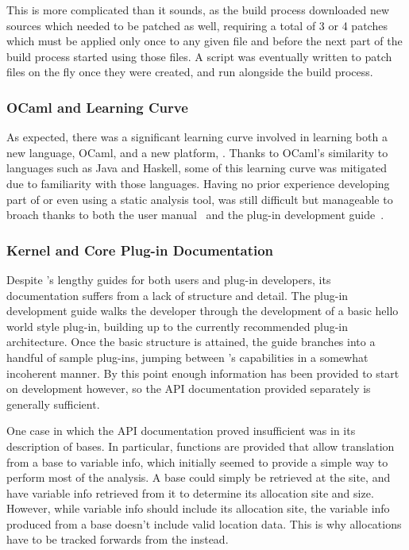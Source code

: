 This is more complicated than it sounds, as the build process downloaded new sources which needed to be patched as well, requiring a total of 3 or 4 patches which must be applied only once to any given file and before the next part of the build process started using those files. A script was eventually written to patch files on the fly once they were created, and run alongside the build process.

\subsubsection{OCaml and  Learning Curve}

As expected, there was a significant learning curve involved in learning both a new language, OCaml, and a new platform, . Thanks to OCaml's similarity to languages such as Java and Haskell, some of this learning curve was mitigated due to familiarity with those languages. Having no prior experience developing part of or even using a static analysis tool,  was still difficult but manageable to broach thanks to both the user manual~\cite{framauser} and the plug-in development guide~\cite{framaplug}.

\subsubsection{Kernel and Core Plug-in Documentation}

Despite 's lengthy guides for both users and plug-in developers, its documentation suffers from a lack of structure and detail. The plug-in development guide walks the developer through the development of a basic hello world style plug-in, building up to the currently recommended plug-in architecture. Once the basic structure is attained, the guide branches into a handful of sample plug-ins, jumping between 's capabilities in a somewhat incoherent manner. By this point enough information has been provided to start on development however, so the API documentation provided separately is generally sufficient.

One case in which the API documentation proved insufficient was in its description of bases. In particular, functions are provided that allow translation from a base to variable info, which initially seemed to provide a simple way to perform most of the analysis. A base could simply be retrieved at the \free{} site, and have variable info retrieved from it to determine its allocation site and size. However, while variable info should include its allocation site, the variable info produced from a base doesn't include valid location data. This is why allocations have to be tracked forwards from the \malloc{} instead.

